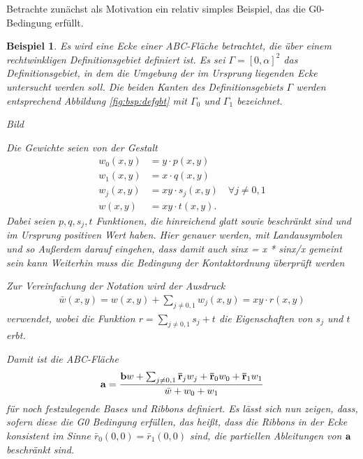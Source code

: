 \documentclass[10pt,a4paper,oneside]{report}
\newtheorem{beispiel}{Beispiel}[chapter]
\begin{document}
Betrachte zunächst als Motivation ein relativ simples Beispiel, das die G0-Bedingung erfüllt.
\begin{beispiel} \label{bsp:G0pos}
Es wird eine Ecke einer ABC-Fläche betrachtet, die über einem rechtwinkligen Definitionsgebiet definiert ist.
Es sei $\Gamma = \left[0,\alpha\right]^2$ das Definitionsgebiet, in dem die Umgebung der im Ursprung liegenden Ecke untersucht werden soll.
Die beiden Kanten des Definitionsgebiets $\Gamma$ werden entsprechend Abbildung \ref{fig:bsp:defgbt} mit $\Gamma_0$ und $\Gamma_1$ bezeichnet.

Bild \label{fig:bsp:defgbt}

Die Gewichte seien von der Gestalt
\begin{align*}
w_0\left(x,y\right) &= y \cdot p\left(x,y\right) \\
w_1\left(x,y\right) &= x \cdot q\left(x,y\right) \\
w_j\left(x,y\right) &= xy \cdot s_j\left(x,y\right) \quad \forall j \neq 0,1 \\
w\left(x,y\right) &= xy \cdot t\left(x,y\right).
\end{align*}
Dabei seien $p, q, s_j, t$ Funktionen, die hinreichend glatt sowie beschränkt sind und im Ursprung positiven Wert haben.
Hier genauer werden, mit Landausymbolen und so
Außerdem darauf eingehen, dass damit auch sinx = x * sinx/x gemeint sein kann
Weiterhin muss die Bedingung der Kontaktordnung überprüft werden

Zur Vereinfachung der Notation wird der Ausdruck
\begin{align*}
\bar{w}\left(x,y\right) = w\left(x,y\right) + \sum_{j \neq 0,1} w_j\left(x,y\right) = xy \cdot r\left(x,y\right)
\end{align*}
verwendet, wobei die Funktion $r = \sum_{j \neq 0,1} s_j + t$ die Eigenschaften von $s_j$ und $t$ erbt.

Damit ist die ABC-Fläche
\begin{align*}
\bold{a} = \frac{\bold{b} w + \sum_{j \neq 0,1} \bold{\bar{r}}_j w_j + \bold{\bar{r}}_0 w_0 + \bold{\bar{r}}_1 w_1}{\bar{w} + w_0 +w_1}
\end{align*}
für noch festzulegende Bases und Ribbons definiert.
Es lässt sich nun zeigen, dass, sofern diese die G0 Bedingung erfüllen, das heißt, dass die Ribbons in der Ecke konsistent im Sinne $\bar{r}_0\left(0,0\right) = \bar{r}_1\left(0,0\right)$ sind, die partiellen Ableitungen von $\bold{a}$ beschränkt sind.


\end{beispiel}
\end{document}
